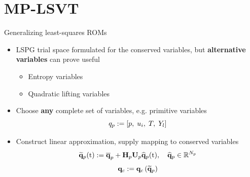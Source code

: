 \documentclass[]{beamer}
\begin{document}
\section*{MP-LSVT}

\begin{frame}{Generalizing least-squares ROMs}
    \begin{itemize}
		\item LSPG trial space formulated for the conserved variables, but \textbf{alternative variables} can prove useful
		\begin{itemize}
			\item Entropy variables
			\item Quadratic lifting variables
		\end{itemize}
		\item Choose \textbf{any} complete set of variables, e.g. primitive variables
		\begin{equation*}
			q_p := \left[ p, \; u_i, \; T, \; Y_l \right]
		\end{equation*}
		\item Construct linear approximation, supply mapping to conserved variables
		\begin{equation*}
			\primVecRom(\timeVar) \defEq \primVecCent + \primScale \primTrial \primVecCoef(\timeVar), \quad \primVecCoef \inROne{\numPrimModes}
		\end{equation*}
		\begin{equation*}
			\mathbf{q}_{c} := \mathbf{q}_{c} \left( \mathbf{\widetilde{q}}_{p} \right)
		\end{equation*}
	\end{itemize}
\end{frame}
\end{document}
